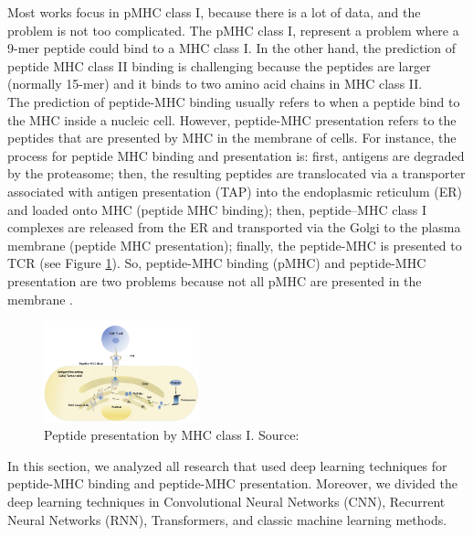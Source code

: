Most works focus in pMHC class I, because there is a lot of data, and the problem is not too complicated. The pMHC class I, represent a problem where a 9-mer peptide could bind to a MHC class I. In the other hand, the prediction of peptide MHC class II binding is challenging because the peptides are larger (normally 15-mer) and it binds to two amino acid chains in MHC class II.\\

The prediction of peptide-MHC binding usually refers to when a peptide bind to the MHC inside a nucleic cell. However, peptide-MHC presentation refers to the peptides that are presented by MHC in the membrane of cells. For instance, the process for peptide MHC binding and presentation is: first, antigens are degraded by the proteasome; then, the resulting peptides are translocated via a transporter associated with antigen presentation (TAP) into the endoplasmic reticulum (ER) and loaded onto MHC (peptide MHC binding); then, peptide–MHC class I complexes are released from the ER and transported via the Golgi to the plasma membrane (peptide MHC presentation); finally, the peptide-MHC is presented to TCR \cite{neefjes2011towards} (see Figure \ref{fig:mhc1_}). So, peptide-MHC binding (pMHC) and peptide-MHC presentation are two problems because not all pMHC are presented in the membrane \cite{mill2022neoms, de2020neoantigen, mill2022neoms, bulik2019deep, bassani2015mass, yadav2014predicting}. \\

\begin{figure}[H]
	\centering
	\includegraphics[width=0.4\textwidth]{img/neoantigen/mhc1.jpg}
	\caption{Peptide presentation by MHC class I. Source: \cite{zhang2019application}}
	\label{fig:mhc1_}
\end{figure}

In this section, we analyzed all research that used deep learning techniques for peptide-MHC binding and peptide-MHC presentation. Moreover, we divided the deep learning techniques in Convolutional Neural Networks (CNN), Recurrent Neural Networks (RNN), Transformers, and classic machine learning methods.\\

